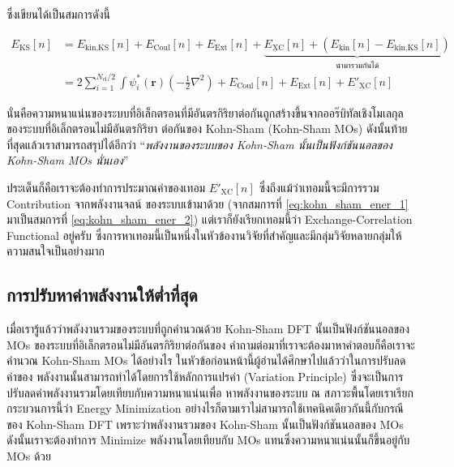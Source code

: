 \noindent ซึ่งเขียนได้เป็นสมการดังนี้

\begin{align}
    \label{eq:kohn_sham_ener_1}
    E_{\text{KS}}[n] &= E_{\text{kin,KS}}[n] + E_{\text{Coul}}[n] + E_{\text{Ext}}[n] + 
    \underbrace{E_{\text{XC}}[n] + (E_{\text{kin}}[n] - E_{\text{kin,KS}}[n])}_{\text{นำมารวมกันได้}} \\
    \label{eq:kohn_sham_ener_2}
    &= 2 \sum^{N_{\text{el}}/2}_{i=1} \int \psi^{\ast}_{i}(\bm{r}) \left ( -\frac{1}{2}\nabla^{2} \right ) 
    + E_{\text{Coul}}[n] + E_{\text{Ext}}[n] + {E'}_{\text{XC}}[n]
\end{align}

\noindent นั่นคือความหนาแน่นของระบบที่อิเล็กตรอนที่มีอันตรกิริยาต่อกันถูกสร้างขึ้นจากออร๊บิทัลเชิงโมเลกุลของระบบที่อิเล็กตรอนไม่มีอันตรกิริยา%
ต่อกันของ Kohn-Sham (Kohn-Sham MOs) ดังนั้นท้ายที่สุดแล้วเราสามารถสรุปได้อีกว่า \enquote{\textit{พลังงานของระบบของ Kohn-Sham 
นั้นเป็นฟังก์ชันนอลของ Kohn-Sham MOs นั่นเอง}}

ประเด็นก็คือเราจะต้องทำการประมาณค่าของเทอม ${E'}_{\text{XC}}[n]$ ซึ่งถึงแม้ว่าเทอมนี้จะมีการรวม Contribution จากพลังงานจลน์%
ของระบบเข้ามาด้วย (จากสมการที่ \ref{eq:kohn_sham_ener_1} มาเป็นสมการที่ \ref{eq:kohn_sham_ener_2}) แต่เราก็ยังเรียกเทอมนี้ว่า 
Exchange-Correlation Functional อยู่ครับ ซึ่งการหาเทอมนี้เป็นหนึ่งในหัวข้องานวิจัยที่สำคัญและมีกลุ่มวิจัยหลายกลุ่มให้ความสนใจเป็นอย่างมาก

\subsection{การปรับหาค่าพลังงานให้ต่ำที่สุด}
\label{ssec:kohn_sham_ener_minimize}

เมื่อเรารู้แล้วว่าพลังงานรวมของระบบที่ถูกคำนวณด้วย Kohn-Sham DFT นั้นเป็นฟังก์ชันนอลของ MOs ของระบบที่อิเล็กตรอนไม่มีอันตรกิริยาต่อกันของ 
คำถามต่อมาที่เราจะต้องมาหาคำตอบก็คือเราจะคำนวณ Kohn-Sham MOs ได้อย่างไร ในหัวข้อก่อนหน้านี้ผู้อ่านได้ศึกษาไปแล้วว่าในการปรับลดค่าของ%
พลังงานนั้นสามารถทำได้โดยการใช้หลักการแปรค่า (Variation Principle) ซึ่งจะเป็นการปรับลดค่าพลังงานรวมโดยเทียบกับความหนาแน่นเพื่อ%
หาพลังงานของระบบ ณ สภาวะพื้นโดยเราเรียกกระบวนการนี้ว่า Energy Minimization อย่างไรก็ตามเราไม่สามารถใช้เทคนิคเดียวกันนี้กับกรณีของ%
Kohn-Sham DFT เพราะว่าพลังงานรวมของ Kohn-Sham นั้นเป็นฟังก์ชันนอลของ MOs ดังนั้นเราจะต้องทำการ Minimize พลังงานโดยเทียบกับ MOs 
แทนซึ่งความหนาแน่นนั้นก็ขึ้นอยู่กับ MOs ด้วย 

